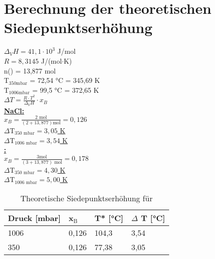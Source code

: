\section*{Berechnung der theoretischen Siedepunktserhöhung}
	$\Delta _V H = 41,1 \cdot 10^3$ J/mol \\
	$R = 8,3145$ J/(mol$\cdot$K) \\
	\newline
	n() = 13,877 mol \\
	T$_{350\text{mbar}}$ = 72,54 °C = 345,69 K \\
	T$_{1006\text{mbar}}$ = 99,5 °C = 372,65 K \\
	\newline
	$\Delta T = \frac{R \cdot T^2}{\Delta _{V}H} \cdot x_{B}$ \\
	\newline
	\newline
	\underline{\textbf{NaCl:}} \\
	\newline
	$x_B = \frac{2 \textrm{ mol}}{(2 + 13,877)\textrm{mol}} = 0,126$\\
	\newline
	\underline{\underline{$\Delta \text{T}_{350 \text{ mbar}} = 3,05$ K}} \\ 
	\newline
	\underline{\underline{$\Delta \text{T}_{1006 \text{ mbar}} = 3,54$ K}} \\
	\newline
	\newline
	\underline{\textbf{:}} \\
	\newline
	$x_B = \frac{3 \textrm{mol}}{(3 + 13,877)\textrm{ mol}} = 0,178$\\
	\newline
	\underline{\underline{$\Delta \text{T}_{350 \text{ mbar}} = 4,30$ K}} \\ 
	\newline
	\underline{\underline{$\Delta \text{T}_{1006 \text{ mbar}} = 5,00$ K}} \\	

	\begin{table}[H]
		\caption{Theoretische Siedepunktserhöhung für }
		\label{tab:Siedepunkt_NaCl}
			\begin{tabular}{|l|l|l|l|}
			\hline
			\textbf{Druck [mbar]}	&	\textbf{x$_\text{B}$}	&	\textbf{T* [°C]} & \textbf{$\Delta$ T [°C]} \\\hline
			1006	&	0,126	&	104,3	&	3,54 \\
			350		&	0,126	&	77,38	&	3,05 \\\hline
			\end{tabular}
	\end{table} 
	
